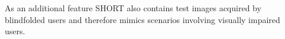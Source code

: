As an additional feature SHORT also contains test images acquired by blindfolded users and therefore mimics scenarios involving visually impaired users. 

%
%
%
%
%
%
